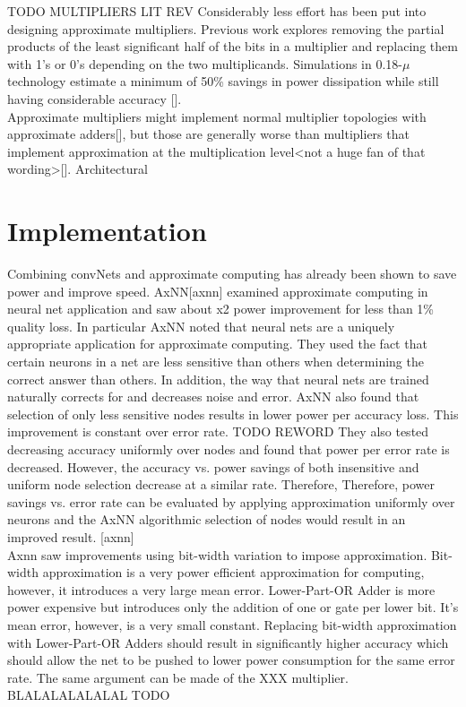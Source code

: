 \documentclass[conference]{IEEEtran}
\begin{document}
TODO MULTIPLIERS LIT REV
	\indent Considerably less effort has been put into designing approximate multipliers. Previous work explores removing the partial products of the least significant half of the bits in a multiplier and replacing them with 1's or 0's depending on the two multiplicands. Simulations in 0.18-$\mu$ technology estimate a minimum of 50\% savings in power dissipation while still having considerable accuracy [].\\
	\indent Approximate multipliers might implement normal multiplier topologies with approximate adders[], but those are generally worse than multipliers that implement approximation at the multiplication level<not a huge fan of that wording>[]. Architectural \\



\section{Implementation}
	\indent Combining convNets and approximate computing has already been shown to save power and improve speed. AxNN[axnn] examined approximate computing in neural net application and saw about x2 power improvement for less than 1\% quality loss. In particular AxNN noted that neural nets are a uniquely appropriate application for approximate computing. They used the fact that certain neurons in a net are less sensitive than others when determining the correct answer than others. In addition, the way that neural nets are trained naturally corrects for and decreases noise and error. AxNN also found that selection of only less sensitive nodes results in lower power per accuracy loss. This improvement is constant over error rate. TODO REWORD
They also tested decreasing accuracy uniformly over nodes and found that power per error rate is decreased. However, the accuracy vs. power savings of both insensitive and uniform node selection decrease at a similar rate. Therefore, 
Therefore, power savings vs. error rate can be evaluated by applying approximation uniformly over neurons and the AxNN algorithmic selection of nodes would result in an improved result. [axnn] \\


	\indent Axnn saw improvements using bit-width variation to impose approximation. Bit-width approximation is a very power efficient approximation for computing, however, it introduces a very large mean error. Lower-Part-OR Adder is more power expensive but introduces only the addition of one or gate per lower bit. It's mean error, however, is a very small constant. Replacing bit-width approximation with Lower-Part-OR Adders should result in significantly higher accuracy which should allow the net to be pushed to lower power consumption for the same error rate. The same argument can be made of the XXX multiplier. BLALALALALALAL TODO\\
\end{document}
